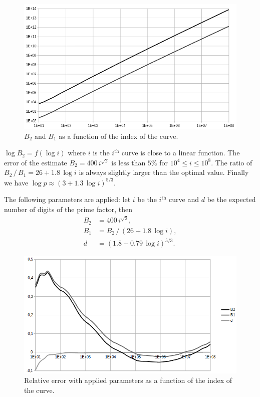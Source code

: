 \documentclass[a4paper, 11pt, pdftex]{report}
\theoremstyle{plain}
\theoremstyle{definition}
\begin{document}
\begin{figure}[!ht]
	\vspace*{0.0cm}
	\centering
	\includegraphics[width=15.5cm, angle=0]{img/B1_B2_n.png}
	\caption{\label{fig:B_12_n} $B_2$ and $B_1$ as a function of the index of the curve.}
\end{figure}

$\log B_2 = f(\log i)$ where $i$ is the $i^\text{th}$ curve is close to a linear function.
The error of the estimate $B_2 = 400\, i^{\sqrt{2}}$ is less than $5\%$ for
$10^4 \leq i \leq 10^8$. The ratio of $B_2\, /\, B_1 = 26 + 1.8\, \log{i}$ is always
slightly larger than the optimal value. Finally we have
$\log p \approx (3 + 1.3\, \log i)^{5/3}$.

The following parameters are applied: let $i$ be the $i^\text{th}$ curve and $d$ be the
expected number of digits of the prime factor, then
\begin{align*}
B_2 &= 400\, i^{\sqrt{2}},\\
B_1 &= B_2\, /\, (26 + 1.8\, \log{i}),\\
d &= (1.8 + 0.79\, \log i)^{5/3}.
\end{align*}
\begin{figure}[!ht]
	\vspace*{-0.8cm}
	\centering
	\includegraphics[width=12.0cm, angle=0]{img/err_B1_B2_digits.png}
	\caption{\label{fig:B12_n} Relative error with applied parameters as a function of the index of the curve.}
\end{figure}
\end{document}
